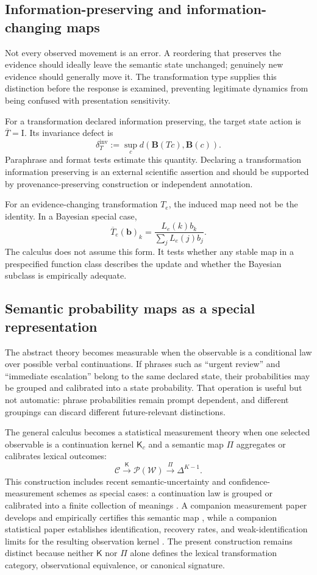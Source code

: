 \documentclass[11pt]{article}
\newcommand{\Prob}{\mathcal P}
\newcommand{\Ctxt}{\mathcal C}
\newcommand{\Words}{\mathcal W}
\newcommand{\Bmap}{\mathbf B}
\newcommand{\Kern}{\mathsf K}
\newcommand{\Id}{\mathrm I}
\begin{document}
{\subsection{Information-preserving and information-changing maps}

Not every observed movement is an error.  A reordering that preserves the
evidence should ideally leave the semantic state unchanged; genuinely new
evidence should generally move it.  The transformation type supplies this
distinction before the response is examined, preventing legitimate dynamics
from being confused with presentation sensitivity.

For a transformation declared information preserving, the target state action is $\overline T=\Id$. Its invariance defect is
\[
 \delta_T^{\mathrm{inv}}:=\sup_c d(\Bmap(Tc),\Bmap(c)).
\]
Paraphrase and format tests estimate this quantity. Declaring a transformation information preserving is an external scientific assertion and should be supported by provenance-preserving construction or independent annotation.

For an evidence-changing transformation $T_e$, the induced map need not be the identity. In a Bayesian special case,
\[
 \overline T_e(\bm b)_k=
 \frac{L_e(k)b_k}{\sum_jL_e(j)b_j}.
\]
The calculus does not assume this form. It tests whether any stable map in a prespecified function class describes the update and whether the Bayesian subclass is empirically adequate.

}

\subsection{Semantic probability maps as a special representation}

The abstract theory becomes measurable when the observable is a conditional
law over possible verbal continuations.  If phrases such as ``urgent review''
and ``immediate escalation'' belong to the same declared state, their
probabilities may be grouped and calibrated into a state probability.  That
operation is useful but not automatic: phrase probabilities remain prompt
dependent, and different groupings can discard different future-relevant
distinctions.

The general calculus becomes a statistical measurement theory when one selected observable is a continuation kernel $\Kern_c$ and a semantic map $\Pi$ aggregates or calibrates lexical outcomes:
\[
 \Ctxt\xrightarrow{\Kern}\Prob(\Words)
 \xrightarrow{\Pi}\Delta^{K-1}.
\]
This construction includes recent semantic-uncertainty and
confidence-measurement schemes as special cases: a continuation law is
grouped or calibrated into a finite collection of meanings
\cite{farquhar2024,kadavath2022,kuhn2023,tian2023}.  A companion measurement
paper develops and empirically certifies this semantic map
\cite{dixon2026}, while a companion statistical paper establishes
identification, recovery rates, and weak-identification limits for the
resulting observation kernel \cite{dixon2026semanticobservation}.  The present
construction remains distinct because neither $\Kern$ nor $\Pi$ alone defines
the lexical transformation category, observational equivalence, or canonical
signature.
\end{document}
